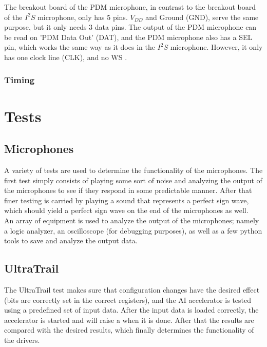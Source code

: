 The breakout board of the PDM microphone, in contrast to the breakout board of the $I^2S$ microphone, only has 5 pins.
$V_{DD}$ and Ground (GND), serve the same purpose, but it only needs 3 data pins.
The output of the PDM microphone can be read on 'PDM Data Out' (DAT), and the PDM microphone also has a SEL pin, which works the same way as
it does in the $I^2S$ microphone.
However, it only has one clock line (CLK), and no WS \cite{pdm_mic_pinout}.

\subsubsection{Timing}


\section{Tests}

\subsection{Microphones}

A variety of tests are used to determine the functionality of the microphones.
The first test simply consists of playing some sort of noise and analyzing the output of the microphones to see if
they respond in some predictable manner.
After that finer testing is carried by playing a sound that represents a perfect sign wave,
which should yield a perfect sign wave on the end of the microphones as well.\\
An array of equipment is used to analyze the output of the microphones; namely a logic analyzer, an oscilloscope
(for debugging purposes), as well as a few python tools to save and analyze the output data.

\subsection{UltraTrail}

The UltraTrail test makes sure that configuration changes have the desired effect (bits are correctly set in the correct registers),
and the AI accelerator is tested using a predefined set of input data.
After the input data is loaded correctly, the accelerator is started and will raise a  when it is done.
After that the results are compared with the desired results, which finally determines the functionality of the drivers.
